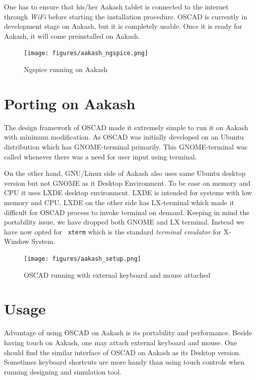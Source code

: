 One has to ensure that his/her Aakash tablet is connected to the
internet through \emph{WiFi} before starting the installation
procedure. OSCAD is currently in development stage on Aakash, but it
is completely usable. Once it is ready for Aakash, it will come
preinstalled on Aakash.

\begin{figure}[h!]
\centering
\texttt{[image: figures/aakash\_ngspice.png]}
\caption{Ngspice running on Aakash}
\label{fig: NgSpice running on Aakash}
\end{figure}

\section{Porting on Aakash}

The design framework of OSCAD made it extremely simple to run it on
Aakash with minimum modification. As OSCAD was initially developed on
an Ubuntu distribution which has GNOME-terminal primarily. This
GNOME-terminal was called whenever there was a need for user input
using terminal.

On the other hand, GNU/Linux side of Aakash also uses same Ubuntu
desktop version but not GNOME as it Desktop Environment. To be ease on
memory and CPU it uses LXDE desktop environment. LXDE is intended for
systems with low memory and CPU. LXDE on the other side has
LX-terminal which made it difficult for OSCAD process to invoke
terminal on demand. Keeping in mind the portability issue, we have
dropped both GNOME and LX terminal. Instead we have now opted for {\tt
  xterm} which is the standard \emph{terminal emulator} for X-Window
System. 

\begin{figure}[h!]
\centering
\texttt{[image: figures/aakash\_setup.png]}
\caption{OSCAD running with external keyboard and mouse attached}
\label{fig: OSCAD running with external keyboard and mouse attached}
\end{figure}

\section{Usage}

Advantage of using OSCAD on Aakash is its portability and
performance. Beside having touch on Aakash, one may attach external
keyboard and mouse. One should find the similar interface of OSCAD on
Aakash as its Desktop version. Sometimes keyboard shortcuts are more
handy than using touch controls when running designing and simulation
tool.


